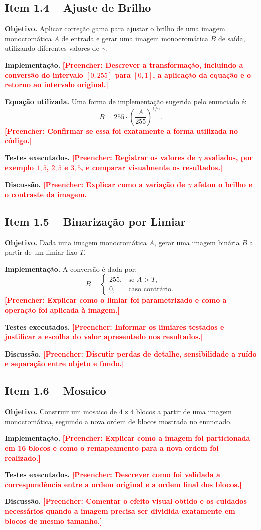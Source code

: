 \documentclass[12pt,a4paper]{article}
\newcommand{\placeholder}[1]{\textcolor{red}{\textbf{[Preencher: #1]}}}
\newcommand{\campo}[2]{\textbf{#1.} #2\par}
\begin{document}
\subsection{Item 1.4 -- Ajuste de Brilho}

\campo{Objetivo}{Aplicar correção gama para ajustar o brilho de uma imagem monocromática $A$ de entrada e gerar uma imagem monocromática $B$ de saída, utilizando diferentes valores de $\gamma$.}
\campo{Implementação}{\placeholder{Descrever a transformação, incluindo a conversão do intervalo $[0,255]$ para $[0,1]$, a aplicação da equação e o retorno ao intervalo original.}}
\campo{Equação utilizada}{Uma forma de implementação sugerida pelo enunciado é:
\[
  B = 255 \cdot \left(\frac{A}{255}\right)^{1/\gamma}.
\]
\placeholder{Confirmar se essa foi exatamente a forma utilizada no código.}}
\campo{Testes executados}{\placeholder{Registrar os valores de $\gamma$ avaliados, por exemplo $1{,}5$, $2{,}5$ e $3{,}5$, e comparar visualmente os resultados.}}
\campo{Discussão}{\placeholder{Explicar como a variação de $\gamma$ afetou o brilho e o contraste da imagem.}}

\subsection{Item 1.5 -- Binarização por Limiar}

\campo{Objetivo}{Dada uma imagem monocromática $A$, gerar uma imagem binária $B$ a partir de um limiar fixo $T$.}
\campo{Implementação}{A conversão é dada por:
\[
  B =
  \begin{cases}
    255, & \text{se } A > T,\\
    0, & \text{caso contrário.}
  \end{cases}
\]
\placeholder{Explicar como o limiar foi parametrizado e como a operação foi aplicada à imagem.}}
\campo{Testes executados}{\placeholder{Informar os limiares testados e justificar a escolha do valor apresentado nos resultados.}}
\campo{Discussão}{\placeholder{Discutir perdas de detalhe, sensibilidade a ruído e separação entre objeto e fundo.}}

\subsection{Item 1.6 -- Mosaico}

\campo{Objetivo}{Construir um mosaico de $4 \times 4$ blocos a partir de uma imagem monocromática, seguindo a nova ordem de blocos mostrada no enunciado.}
\campo{Implementação}{\placeholder{Explicar como a imagem foi particionada em 16 blocos e como o remapeamento para a nova ordem foi realizado.}}
\campo{Testes executados}{\placeholder{Descrever como foi validada a correspondência entre a ordem original e a ordem final dos blocos.}}
\campo{Discussão}{\placeholder{Comentar o efeito visual obtido e os cuidados necessários quando a imagem precisa ser dividida exatamente em blocos de mesmo tamanho.}}
\end{document}
